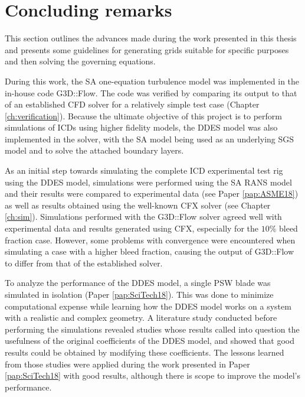 %           

\chapter{Concluding remarks\label{ch:conclusion}}
This section outlines the advances made during the work presented in this thesis and presents some guidelines for generating grids suitable for specific purposes and then solving the governing equations.

During this work, the SA one-equation turbulence model was implemented in the in-house code G3D::Flow. The code was verified by comparing its output to that of an established CFD solver for a relatively simple test case (Chapter \ref{ch:verification}). Because the ultimate objective of this project is to perform simulations of ICDs using higher fidelity models, the DDES model was also implemented in the solver, with the SA model being used as an underlying SGS model and to solve the attached boundary layers.

As an initial step towards simulating the complete ICD experimental test rig using the DDES model, simulations were performed using the SA RANS model and their results were compared to experimental data (see Paper \ref{pap:ASME18}) as well as results obtained using the well-known CFX solver (see Chapter \ref{ch:sim}). Simulations performed with the G3D::Flow solver agreed well with experimental data and results generated using CFX, especially for the $10\%$ bleed fraction case. However, some problems with convergence were encountered when simulating a case with a higher bleed fraction, causing the output of G3D::Flow to differ from that of the established solver.

To analyze the performance of the DDES model, a single PSW blade was simulated in isolation (Paper \ref{pap:SciTech18}). This was done to minimize computational expense while learning how the DDES model works on a system with a realistic and complex geometry. A literature study conducted before performing the simulations revealed studies whose results called into question the usefulness of the original coefficients of the DDES model, and showed that good results could be obtained by modifying these coefficients. The lessons learned from those studies were applied during the work presented in Paper \ref{pap:SciTech18} with good results, although there is scope to improve the model's performance.

